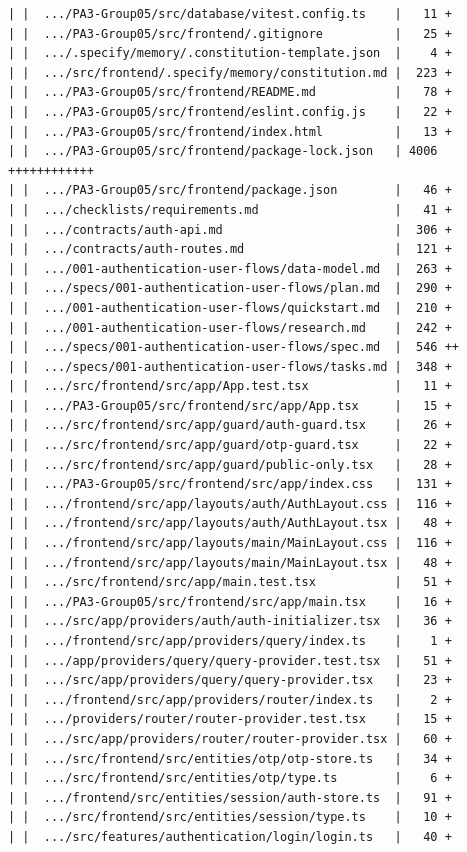 \documentclass[12pt]{article}
\begin{document}
\begin{lstlisting}[numbers=none,breaklines=true]
| |  .../PA3-Group05/src/database/vitest.config.ts    |   11 +
| |  .../PA3-Group05/src/frontend/.gitignore          |   25 +
| |  .../.specify/memory/.constitution-template.json  |    4 +
| |  .../src/frontend/.specify/memory/constitution.md |  223 +
| |  .../PA3-Group05/src/frontend/README.md           |   78 +
| |  .../PA3-Group05/src/frontend/eslint.config.js    |   22 +
| |  .../PA3-Group05/src/frontend/index.html          |   13 +
| |  .../PA3-Group05/src/frontend/package-lock.json   | 4006 ++++++++++++
| |  .../PA3-Group05/src/frontend/package.json        |   46 +
| |  .../checklists/requirements.md                   |   41 +
| |  .../contracts/auth-api.md                        |  306 +
| |  .../contracts/auth-routes.md                     |  121 +
| |  .../001-authentication-user-flows/data-model.md  |  263 +
| |  .../specs/001-authentication-user-flows/plan.md  |  290 +
| |  .../001-authentication-user-flows/quickstart.md  |  210 +
| |  .../001-authentication-user-flows/research.md    |  242 +
| |  .../specs/001-authentication-user-flows/spec.md  |  546 ++
| |  .../specs/001-authentication-user-flows/tasks.md |  348 +
| |  .../src/frontend/src/app/App.test.tsx            |   11 +
| |  .../PA3-Group05/src/frontend/src/app/App.tsx     |   15 +
| |  .../src/frontend/src/app/guard/auth-guard.tsx    |   26 +
| |  .../src/frontend/src/app/guard/otp-guard.tsx     |   22 +
| |  .../src/frontend/src/app/guard/public-only.tsx   |   28 +
| |  .../PA3-Group05/src/frontend/src/app/index.css   |  131 +
| |  .../frontend/src/app/layouts/auth/AuthLayout.css |  116 +
| |  .../frontend/src/app/layouts/auth/AuthLayout.tsx |   48 +
| |  .../frontend/src/app/layouts/main/MainLayout.css |  116 +
| |  .../frontend/src/app/layouts/main/MainLayout.tsx |   48 +
| |  .../src/frontend/src/app/main.test.tsx           |   51 +
| |  .../PA3-Group05/src/frontend/src/app/main.tsx    |   16 +
| |  .../src/app/providers/auth/auth-initializer.tsx  |   36 +
| |  .../frontend/src/app/providers/query/index.ts    |    1 +
| |  .../app/providers/query/query-provider.test.tsx  |   51 +
| |  .../src/app/providers/query/query-provider.tsx   |   23 +
| |  .../frontend/src/app/providers/router/index.ts   |    2 +
| |  .../providers/router/router-provider.test.tsx    |   15 +
| |  .../src/app/providers/router/router-provider.tsx |   60 +
| |  .../src/frontend/src/entities/otp/otp-store.ts   |   34 +
| |  .../src/frontend/src/entities/otp/type.ts        |    6 +
| |  .../frontend/src/entities/session/auth-store.ts  |   91 +
| |  .../src/frontend/src/entities/session/type.ts    |   10 +
| |  .../src/features/authentication/login/login.ts   |   40 +

\end{lstlisting}
\end{document}
